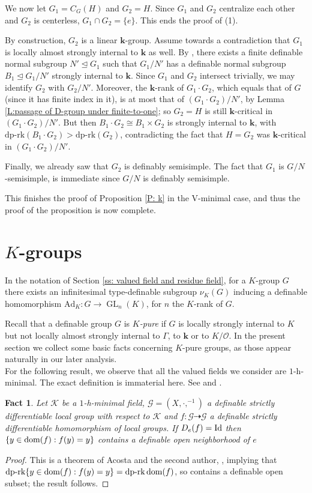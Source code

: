 \documentclass[11pt]{amsart}
\DeclareMathOperator{\gl}{GL} \DeclareMathOperator{\agl}{AGL}
\newtheorem{fact}[theorem]{Fact}
\theoremstyle{definition}
\newcommand{\bk}{\textbf{k}}
\newcommand{\CK}{{\mathcal K}}
\newcommand{\CO}{{\mathcal O}}
\newcommand{\CG}{{\mathcal G}}
\newcommand{\0}{\emptyset}
\newcommand{\ad}{\mathrm{Ad}}
\def\dpr{\mathrm{dp\text{-}rk}}
\begin{document}
We now let $G_1=C_G(H)$ and $G_2=H$. Since $G_1$ and $G_2$ centralize each other and $G_2$ is centerless, $G_1\cap G_2=\{e\}$.
This ends the proof of (1).

By construction, $G_2$ is a linear $\bk$-group. Assume towards a contradiction that $G_1$ is locally almost strongly internal to $\bk$ as well. By \cite[Proposition 6.2]{HaHaPeGps}, there exists a finite definable normal subgroup $N'\trianglelefteq G_1$ such that $G_1/N'$ has a definable normal subgroup $B_1\trianglelefteq G_1/N'$ strongly internal to $\bk$. Since $G_1$ and $G_2$ intersect trivially, we may identify $G_2$ with $G_2/N'$. Moreover, the $\bk$-rank of $G_1\cdot G_2$, which equals that of $G$ (since it has finite index in it), is at most that of $(G_1\cdot G_2)/N'$, by Lemma \ref{L:passage of D-group under finite-to-one}; so $G_2=H$ is still $\bk$-critical in $(G_1\cdot G_2)/N'$. 
But then $B_1\cdot G_2 \cong  B_1\times G_2$ is strongly internal to $\bk$, with 
$\dpr(B_1\cdot G_2)>\dpr(G_2)$, contradicting the fact that $H=G_2$ was $\bk$-critical in $(G_1\cdot G_2)/N'$.

Finally,  we already saw that $G_2$ is definably semisimple. The fact that $G_1$  is $G/N$-semisimple, is immediate since $G/N$ is definably semisimple.


This finishes the proof of Proposition \ref{P: k} in the V-minimal case, and thus the proof of the proposition is now complete. 


\section{$K$-groups}
In the notation of Section \ref{ss: valued field and residue field}, for a $K$-group $G$ there exists an infinitesimal type-definable subgroup $\nu_K(G)$  inducing a definable homomorphism $\ad_K:G\to \gl_n(K)$, for $n$ the $K$-rank of $G$.

Recall that a definable group $G$ is \emph{$K$-pure} if $G$ is locally  strongly internal to $K$ but not locally almost strongly internal to $\Gamma$, to $\bk$ or to $K/\CO$.  In the present section we collect some basic facts concerning  $K$-pure groups, as those appear naturally in our later analysis. \\

For the following result, we observe that all the valued fields we consider are $1$-h-minimal. The exact definition is immaterial here. See \cite{hensel-min} and \cite[Section 4.5]{HaHaPeVF}.

\begin{fact}\cite[Theorem 2]{AcHa}\label{F:AcHa}
    Let $\CK$ be a $1$-h-minimal field, $\CG=(X,\cdot, ^{-1})$ a definable strictly differentiable local group with respect to $\CK$ and $f:\CG\dashrightarrow \CG$ a definable strictly differentiable homomorphism of local groups. If $D_e(f)=\operatorname{Id}$ then $\{y\in \operatorname{dom}(f):f(y)=y\}$ contains a definable open neighborhood of $e$
\end{fact}
\begin{proof} This is a theorem of Acosta and the second author, 
    \cite[Theorem 2]{AcHa}, implying that $\dpr \{y\in \dom(f) :f(y)=y\}=\dpr \dom(f)$, so contains a definable open subset; the result follows.
\end{proof}
\end{document}
